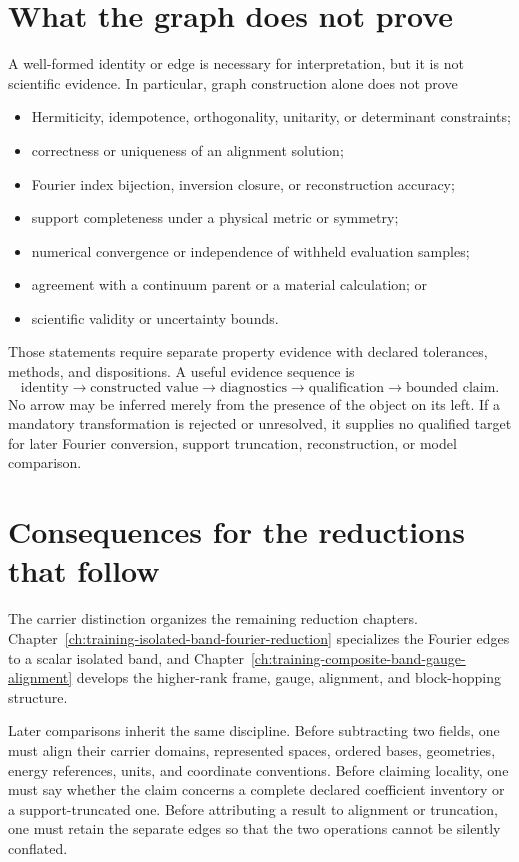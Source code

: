 \section{What the graph does not prove}

A well-formed identity or edge is necessary for interpretation, but it is not
scientific evidence. In particular, graph construction alone does not prove

\begin{itemize}
  \item Hermiticity, idempotence, orthogonality, unitarity, or determinant
        constraints;
  \item correctness or uniqueness of an alignment solution;
  \item Fourier index bijection, inversion closure, or reconstruction accuracy;
  \item support completeness under a physical metric or symmetry;
  \item numerical convergence or independence of withheld evaluation samples;
  \item agreement with a continuum parent or a material calculation; or
  \item scientific validity or uncertainty bounds.
\end{itemize}

Those statements require separate property evidence with declared tolerances,
methods, and dispositions. A useful evidence sequence is
\begin{equation}
  \text{identity}
  \longrightarrow
  \text{constructed value}
  \longrightarrow
  \text{diagnostics}
  \longrightarrow
  \text{qualification}
  \longrightarrow
  \text{bounded claim}.
  \label{eq:representation-carrier-evidence-sequence}
\end{equation}
No arrow may be inferred merely from the presence of the object on its left.
If a mandatory transformation is rejected or unresolved, it supplies no
qualified target for later Fourier conversion, support truncation,
reconstruction, or model comparison.

\section{Consequences for the reductions that follow}

The carrier distinction organizes the remaining reduction chapters.
Chapter~\ref{ch:training-isolated-band-fourier-reduction} specializes the
Fourier edges to a scalar isolated band, and
Chapter~\ref{ch:training-composite-band-gauge-alignment} develops the
higher-rank frame, gauge, alignment, and block-hopping structure.

Later comparisons inherit the same discipline. Before subtracting two fields,
one must align their carrier domains, represented spaces, ordered bases,
geometries, energy references, units, and coordinate conventions. Before
claiming locality, one must say whether the claim concerns a complete declared
coefficient inventory or a support-truncated one. Before attributing a result
to alignment or truncation, one must retain the separate edges so that the two
operations cannot be silently conflated.
